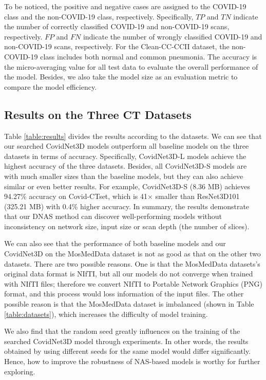 \documentclass[letterpaper]{article}
\begin{document}
To be noticed, the positive and negative cases are assigned to the COVID-19 class and the non-COVID-19 class, respectively. Specifically, $TP$ and $TN$ indicate the number of correctly classified COVID-19 and non-COVID-19 scans, respectively. $FP$ and $FN$ indicate the number of wrongly classified COVID-19 and non-COVID-19 scans, respectively. For the Clean-CC-CCII dataset, the non-COVID-19 class includes both normal and common pneumonia. The accuracy is the micro-averaging value for all test data to evaluate the overall performance of the model. Besides, we also take the model size as an evaluation metric to compare the model efficiency.


\subsection{Results on the Three CT Datasets}

Table \ref{table:results} divides the results according to the datasets. We can see that our searched CovidNet3D models outperform all baseline models on the three datasets in terms of accuracy. Specifically, CovidNet3D-L models achieve the highest accuracy of the three datasets. Besides, all CovidNet3D-S models are with much smaller sizes than the baseline models, but they can also achieve similar or even better results. For example, CovidNet3D-S (8.36 MB) achieves 94.27\% accuracy on Covid-CTset, which is 41$\times$ smaller than ResNet3D101 (325.21 MB) with 0.4\% higher accuracy. In summary, the results demonstrate that our DNAS method can discover well-performing models without inconsistency on network size, input size or scan depth (the number of slices).

We can also see that the performance of both baseline models and our CovidNet3D on the MosMedData dataset is not as good as that on the other two datasets. There are two possible reasons. One is that the MosMedData datasets's original data format is NIfTI, but all our models do not converge when trained with NIfTI files; therefore we convert NIfTI to Portable Network Graphics (PNG) format, and this process would loss information of the input files. The other possible reason is that the MosMedData dataset is imbalanced (shown in Table \ref{table:datasets}), which increases the difficulty of model training.

We also find that the random seed greatly influences on the training of the searched CovidNet3D model through experiments. In other words, the results obtained by using different seeds for the same model would differ significantly. Hence, how to improve the robustness of NAS-based models is worthy for further exploring.
\end{document}

